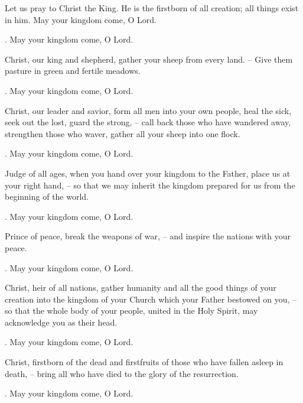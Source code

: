 \lettrine[loversize=0.15,lines=2]{L}{}et us pray to Christ the King. He is the firstborn of all creation; all things exist in him. May your kingdom come, O Lord.
\par \Rbar. May your kingdom come, O Lord.

Christ, our king and shepherd, gather your sheep from every land.
– Give them pasture in green and fertile meadows.
\par \Rbar. May your kingdom come, O Lord.

Christ, our leader and savior, form all men into your own people, heal the sick, seek out the lost, guard the strong,
– call back those who have wandered away, strengthen those who waver, gather all your sheep into one flock.
\par \Rbar. May your kingdom come, O Lord.

Judge of all ages, when you hand over your kingdom to the Father, place us at your right hand,
– so that we may inherit the kingdom prepared for us from the beginning of the world.
\par \Rbar. May your kingdom come, O Lord.

Prince of peace, break the weapons of war,
– and inspire the nations with your peace.
\par \Rbar. May your kingdom come, O Lord.

Christ, heir of all nations, gather humanity and all the good things of your creation into the kingdom of your Church which your Father bestowed on you,
– so that the whole body of your people, united in the Holy Spirit, may acknowledge you as their head.
\par \Rbar. May your kingdom come, O Lord.

Christ, firstborn of the dead and firstfruits of those who have fallen asleep in death,
– bring all who have died to the glory of the resurrection.
\par \Rbar. May your kingdom come, O Lord.